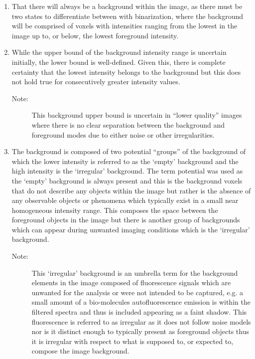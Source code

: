\begin{enumerate}
    \item That there will always be a background within the image, as there must be two states to differentiate between with binarization, where the background will be comprised of voxels with intensities ranging from the lowest in the image up to, or below, the lowest foreground intensity.
    \item While the upper bound of the background intensity range is uncertain initially, the lower bound is well-defined. Given this, there is complete certainty that the lowest intensity belongs to the background but this does not hold true for consecutively greater intensity values.
    \begin{description}
        \item[Note:] This background upper bound is uncertain in ``lower quality'' images where there is no clear separation between the background and foreground modes due to either noise or other irregularities.
    \end{description}
    \item The background is composed of two potential ``groups'' of the background of which the lower intensity is referred to as the `empty' background and the high intensity is the `irregular' background. The term potential was used as the `empty' background is always present and this is the background voxels that do not describe any objects within the image but rather is the absence of any observable objects or phenomena which typically exist in a small near homogeneous intensity range. This composes the space between the foreground objects in the image but there is another group of backgrounds which can appear during unwanted imaging conditions which is the `irregular' background. 
    \begin{description}
        \item[Note:] This `irregular' background is an umbrella term for the background elements in the image composed of fluorescence signals which are unwanted for the analysis or were not intended to be captured, e.g. a small amount of a bio-molecules autofluorescence emission is within the filtered spectra and thus is included appearing as a faint shadow. This fluorescence is referred to as irregular as it does not follow noise models nor is it distinct enough to typically present as foreground objects thus it is irregular with respect to what is supposed to, or expected to, compose the image background. 
    \end{description}
    

\end{enumerate}
